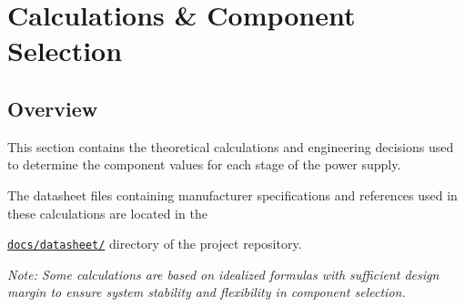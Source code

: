 \section{Calculations \& Component Selection}
\subsection{Overview}
This section contains the theoretical calculations and engineering decisions used to determine the component values for each stage of the power supply.\par
The datasheet files containing manufacturer specifications and references used in these calculations are located in the {\small \href{https://github.com/BaranGuvendiren/adjustable-power-supply/tree/main/docs/datasheets}{\texttt{docs/datasheet/}} directory of the project repository.\par}
{\small\itshape Note: Some calculations are based on idealized formulas with sufficient design margin to ensure system stability and flexibility in component selection.\par}